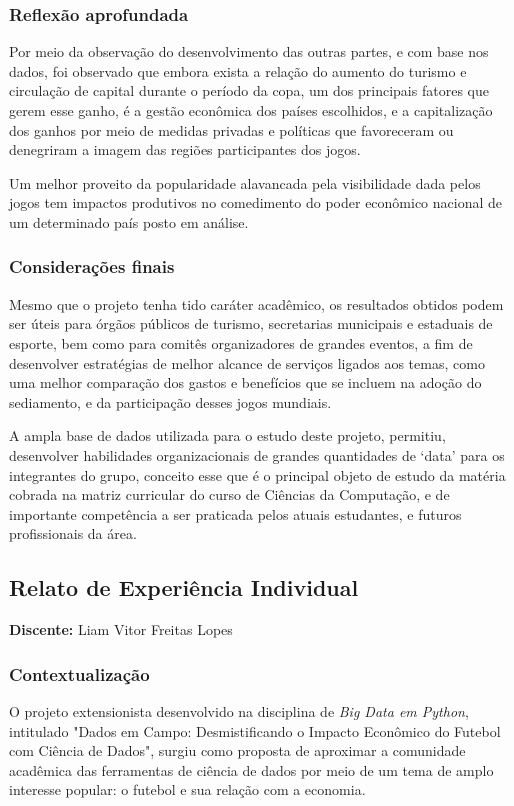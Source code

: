 \documentclass[12pt, a4paper, brazil]{article}
\begin{document}
\subsubsection{Reflexão aprofundada}
Por meio da observação do desenvolvimento das outras partes, e com base nos dados, foi observado que embora exista a relação do aumento do turismo e circulação de capital durante o período da copa, um dos principais fatores que gerem esse ganho, é a gestão econômica dos países escolhidos, e a capitalização dos ganhos por meio de medidas privadas e políticas que favoreceram ou denegriram a imagem das regiões participantes dos jogos.

Um melhor proveito da popularidade alavancada pela visibilidade dada pelos jogos tem impactos produtivos no comedimento do poder econômico nacional de um determinado país posto em análise.

\subsubsection{Considerações finais}
Mesmo que o projeto tenha tido caráter acadêmico, os resultados obtidos podem ser úteis para órgãos públicos de turismo, secretarias municipais e estaduais de esporte, bem como para comitês organizadores de grandes eventos, a fim de desenvolver estratégias de melhor alcance de serviços ligados aos temas, como uma melhor comparação dos gastos e benefícios que se incluem na adoção do sediamento, e da participação desses jogos mundiais.

A ampla base de dados utilizada para o estudo deste projeto, permitiu, desenvolver habilidades organizacionais de grandes quantidades de ‘data’ para os integrantes do grupo, conceito esse que é o principal objeto de estudo da matéria cobrada na matriz curricular do curso de Ciências da Computação, e de importante competência a ser praticada pelos atuais estudantes, e futuros profissionais da área.

\subsection{Relato de Experiência Individual}
\textbf{Discente:} Liam Vitor Freitas Lopes

\subsubsection{Contextualização}
O projeto extensionista desenvolvido na disciplina de \textit{Big Data em Python}, intitulado "Dados em Campo: Desmistificando o Impacto Econômico do Futebol com Ciência de Dados", surgiu como proposta de aproximar a comunidade acadêmica das ferramentas de ciência de dados por meio de um tema de amplo interesse popular: o futebol e sua relação com a economia.
\end{document}
